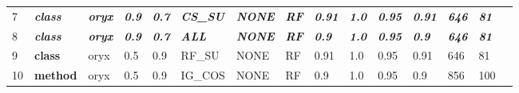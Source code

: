 \begin{table}[ht]
{\begin{tabular}{lllllllllllllll}
7            & \textit{\textbf{class}} & \textit{\textbf{oryx}} & \textit{\textbf{0.9}} & \textit{\textbf{0.7}} & \textit{\textbf{CS\_SU}} & \textit{\textbf{NONE}}     & \textit{\textbf{RF}} & \textit{\textbf{0.91}} & \textit{\textbf{1.0}} & \textit{\textbf{0.95}} & \textit{\textbf{0.91}} & \textit{\textbf{646}} & \textit{\textbf{81}} \\
8            & \textit{\textbf{class}} & \textit{\textbf{oryx}} & \textit{\textbf{0.9}} & \textit{\textbf{0.7}} & \textit{\textbf{ALL}}    & \textit{\textbf{NONE}}     & \textit{\textbf{RF}} & \textit{\textbf{0.9}}  & \textit{\textbf{1.0}} & \textit{\textbf{0.95}} & \textit{\textbf{0.9}}  & \textit{\textbf{646}} & \textit{\textbf{81}} \\
9            & \textbf{class}          & oryx                   & 0.5                   & 0.9                   & RF\_SU                   & NONE                       & RF                   & 0.91                   & 1.0                   & 0.95                   & 0.91                   & 646                   & 81                   \\
10           & \textbf{method}         & oryx                   & 0.5                   & 0.9                   & IG\_COS                  & NONE                       & RF                   & 0.9                    & 1.0                   & 0.95                   & 0.9                    & 856                   & 100                 
\end{tabular}
}
\end{table}